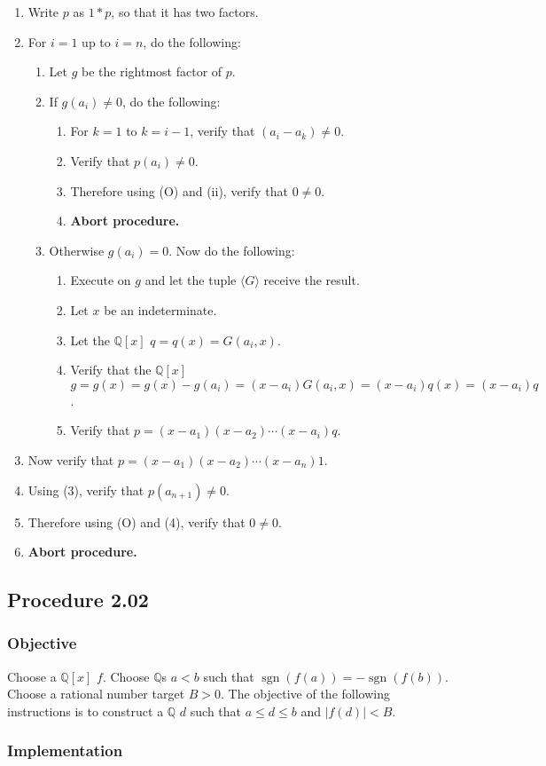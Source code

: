 \documentclass[twocolumn]{article}
\DeclareMathOperator{\sgn}{sgn}
\newcommand{\procedure}[2][]{\subsection*{Procedure #2 \ifthenelse{\equal{#1}{}}{}{(#1)}}\label{sec:procedure #2}}
\newcommand{\objective}{\subsubsection*{Objective}}
\newcommand{\implementation}{\subsubsection*{Implementation}}
\newcommand{\procedurehr}[2][]{\hyperref[sec:procedure #2]{\ifthenelse{\equal{#1}{}}{procedure #2}{#1}}}
\begin{document}
				\begin{enumerate}
					\item Write $p$ as $1*p$, so that it has two factors.
					\item For $i=1$ up to $i=n$, do the following:
					\begin{enumerate}
						\item Let $g$ be the rightmost factor of $p$.
						\item If $g(a_i)\ne 0$, do the following:
						\begin{enumerate}
							\item For $k=1$ to $k=i-1$, verify that $(a_i-a_k)\ne 0$.
							\item Verify that $p(a_i)\ne 0$.
							\item Therefore using (O) and (ii), verify that $0\ne 0$.
							\item \textbf{Abort procedure.}
						\end{enumerate}
						\item Otherwise $g(a_i)=0$. Now do the following:
						\begin{enumerate}
							\item Execute \procedurehr{2.00} on $g$ and let the tuple $\langle G\rangle$ receive the result.
							\item Let $x$ be an indeterminate.
							\item Let the $\mathbb{Q}[x]$ $q=q(x)=G(a_i,x)$.
							\item Verify that the $\mathbb{Q}[x]$ $g=g(x)=g(x)-g(a_i)=(x-a_i)G(a_i,x)=(x-a_i)q(x)=(x-a_i)q$.
							\item Verify that $p=(x-a_1)(x-a_2)\cdots(x-a_i)q$.
						\end{enumerate}
					\end{enumerate}
					\item Now verify that $p=(x-a_1)(x-a_2)\cdots(x-a_n)1$.
					\item Using (3), verify that $p(a_{n+1})\ne 0$.
					\item Therefore using (O) and (4), verify that $0\ne 0$.
					\item \textbf{Abort procedure.}
				\end{enumerate}
		\procedure{2.02}
			\objective
				Choose a $\mathbb{Q}[x]$ $f$. Choose $\mathbb{Q}$s $a<b$ such that $\sgn(f(a))=-\sgn(f(b))$. Choose a rational number target $B>0$. The objective of the following instructions is to construct a $\mathbb{Q}$ $d$ such that $a\le d\le b$ and $\lvert f(d)\rvert<B$.
			\implementation
\end{document}
